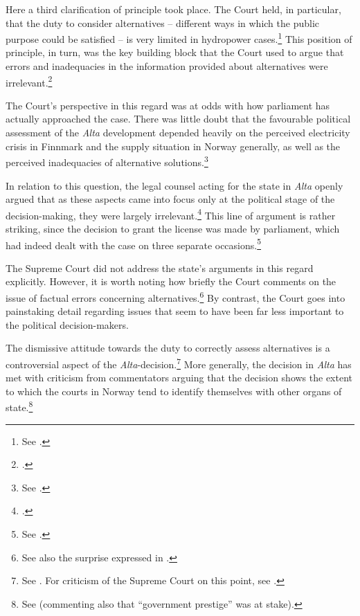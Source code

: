 Here a third clarification of principle took place. The Court held, in particular, that the duty to consider alternatives -- different ways in which the public purpose could be satisfied -- is very limited in hydropower cases.\footnote{See \cite[346]{alta82}.} This position of principle, in turn, was the key building block that the Court used to argue that errors and inadequacies in the information provided about alternatives were irrelevant.\footcite[346]{alta82} 

The Court's perspective in this regard was at odds with how parliament has actually approached the case. There was little doubt that the favourable political assessment of the {\it Alta} development depended heavily on the perceived electricity crisis in Finnmark and the supply situation in Norway generally, as well as the perceived inadequacies of alternative solutions.\footnote{See \cite[338-347]{alta82}.}

In relation to this question, the legal counsel acting for the state in {\it Alta} openly argued that as these aspects came into focus only at the political stage of the decision-making, they were largely irrelevant.\footcite[341]{alta82} This line of argument is rather striking, since the decision to grant the license was made by parliament, which had indeed dealt with the case on three separate occasions.\footnote{See \cite[342]{alta82}.}

The Supreme Court did not address the state's arguments in this regard explicitly. However, it is worth noting how briefly the Court comments on the issue of factual errors concerning alternatives.\footnote{See also the surprise expressed in \cite[349-351]{eckhoff82}.} By contrast, the Court goes into painstaking detail regarding issues that seem to have been far less important to the political decision-makers.


The dismissive attitude towards the duty to correctly assess alternatives is a controversial aspect of the {\it Alta}-decision.\footnote{See \cite[311]{haagensen02}. For criticism of the Supreme Court on this point, see \cite[580-584]{backer86}.} More generally, the decision in {\it Alta} has met with criticism from commentators arguing that the decision shows the extent to which the courts in Norway tend to identify themselves with other organs of state.\footnote{See \cite[64]{graver88} (commenting also that ``government prestige'' was at stake).} 

